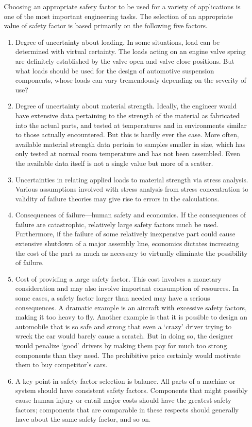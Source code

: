 \documentclass[
10pt,
a4paper,
openany,
svgnames,
]{book}
\begin{document}
Choosing an appropriate safety factor to be used for a variety of applications is one of the most important engineering tasks. The selection of an appropriate value of safety factor is based primarily on the following five factors.

\begin{enumerate}
\item Degree of uncertainty about loading. In some situations, load can be determined with virtual certainty. The loads acting on an engine valve spring are definitely established by the valve open and valve close positions. But what loads should be used for the design of automotive suspension components, whose loads can vary tremendously depending on the severity of use?
\item Degree of uncertainty about material strength. Ideally, the engineer would have extensive data pertaining to the strength of the material as fabricated into the actual parts, and tested at temperatures and in environments similar to those actually encountered. But this is hardly ever the case. More often, available material strength data pertain to samples smaller in size, which has only tested at normal room temperature and has not been assembled. Even the available data itself is not a single value but more of a scatter.
\item Uncertainties in relating applied loads to material strength via stress analysis. Various assumptions involved with stress analysis from stress concentration to validity of failure theories may give rise to errors in the calculations.
\item Consequences of failure—human safety and economics. If the consequences of failure are catastrophic, relatively large safety factors much be used. Furthermore, if the failure of some relatively inexpensive part could cause extensive shutdown of a major assembly line, economics dictates increasing the cost of the part as much as necessary to virtually eliminate the possibility of failure.
\item Cost of providing a large safety factor. This cost involves a monetary consideration and may also involve important consumption of resources. In some cases, a safety factor larger than needed may have a serious consequences. A dramatic example is an aircraft with excessive safety factors, making it too heavy to fly. Another example is that it is possible to design an automobile that is so safe and strong that even a ‘crazy’ driver trying to wreck the car would barely cause a scratch. But in doing so, the designer would penalize ‘good’ drivers by making them pay for much too strong components than they need. The prohibitive price certainly would motivate them to buy competitor’s cars.
\item A key point in safety factor selection is balance. All parts of a machine or system should have consistent safety factors. Components that might possibly cause human injury or entail major costs should have the greatest safety factors; components that are comparable in these respects should generally have about the same safety factor, and so on.
\end{enumerate}
\end{document}
